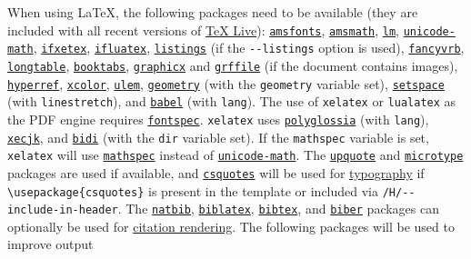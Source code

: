 When using LaTeX, the following packages need to be available (they are
included with all recent versions of
\href{http://www.tug.org/texlive/}{TeX Live}):
\href{https://ctan.org/pkg/amsfonts}{\texttt{amsfonts}},
\href{https://ctan.org/pkg/amsmath}{\texttt{amsmath}},
\href{https://ctan.org/pkg/lm}{\texttt{lm}},
\href{https://ctan.org/pkg/unicode-math}{\texttt{unicode-math}},
\href{https://ctan.org/pkg/ifxetex}{\texttt{ifxetex}},
\href{https://ctan.org/pkg/ifluatex}{\texttt{ifluatex}},
\href{https://ctan.org/pkg/listings}{\texttt{listings}} (if the
\texttt{-\/-listings} option is used),
\href{https://ctan.org/pkg/fancyvrb}{\texttt{fancyvrb}},
\href{https://ctan.org/pkg/longtable}{\texttt{longtable}},
\href{https://ctan.org/pkg/booktabs}{\texttt{booktabs}},
\href{https://ctan.org/pkg/graphicx}{\texttt{graphicx}} and
\href{https://ctan.org/pkg/grffile}{\texttt{grffile}} (if the document
contains images),
\href{https://ctan.org/pkg/hyperref}{\texttt{hyperref}},
\href{https://ctan.org/pkg/xcolor}{\texttt{xcolor}},
\href{https://ctan.org/pkg/ulem}{\texttt{ulem}},
\href{https://ctan.org/pkg/geometry}{\texttt{geometry}} (with the
\texttt{geometry} variable set),
\href{https://ctan.org/pkg/setspace}{\texttt{setspace}} (with
\texttt{linestretch}), and
\href{https://ctan.org/pkg/babel}{\texttt{babel}} (with \texttt{lang}).
The use of \texttt{xelatex} or \texttt{lualatex} as the PDF engine
requires \href{https://ctan.org/pkg/fontspec}{\texttt{fontspec}}.
\texttt{xelatex} uses
\href{https://ctan.org/pkg/polyglossia}{\texttt{polyglossia}} (with
\texttt{lang}), \href{https://ctan.org/pkg/xecjk}{\texttt{xecjk}}, and
\href{https://ctan.org/pkg/bidi}{\texttt{bidi}} (with the \texttt{dir}
variable set). If the \texttt{mathspec} variable is set,
\texttt{xelatex} will use
\href{https://ctan.org/pkg/mathspec}{\texttt{mathspec}} instead of
\href{https://ctan.org/pkg/unicode-math}{\texttt{unicode-math}}. The
\href{https://ctan.org/pkg/upquote}{\texttt{upquote}} and
\href{https://ctan.org/pkg/microtype}{\texttt{microtype}} packages are
used if available, and
\href{https://ctan.org/pkg/csquotes}{\texttt{csquotes}} will be used for
\protect\hyperlink{typography}{typography} if
\texttt{\textbackslash{}usepackage\{csquotes\}} is present in the
template or included via \texttt{/H/-\/-include-in-header}. The
\href{https://ctan.org/pkg/natbib}{\texttt{natbib}},
\href{https://ctan.org/pkg/biblatex}{\texttt{biblatex}},
\href{https://ctan.org/pkg/bibtex}{\texttt{bibtex}}, and
\href{https://ctan.org/pkg/biber}{\texttt{biber}} packages can
optionally be used for \protect\hyperlink{citation-rendering}{citation
rendering}. The following packages will be used to improve output
